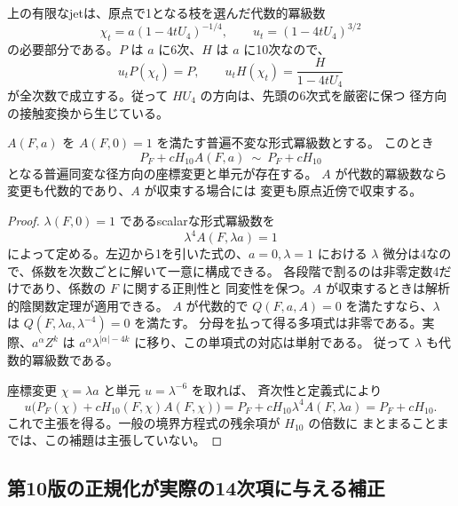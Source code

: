 \begin{remark}[径方向の変更を全次数で書く]
上の有限なjetは、原点で1となる枝を選んだ代数的冪級数
\[
 \chi_t=a(1-4tU_4)^{-1/4},\qquad
 u_t=(1-4tU_4)^{3/2}
\]
の必要部分である。$P$ は $a$ に6次、$H$ は $a$ に10次なので、
\[
 u_tP(\chi_t)=P,
 \qquad u_tH(\chi_t)=\frac{H}{1-4tU_4}
\]
が全次数で成立する。従って $HU_4$ の方向は、先頭の6次式を厳密に保つ
径方向の接触変換から生じている。
\end{remark}

\begin{lemma}[Hessian項の単元係数は径方向に正規化できる]
\label{lem:v11-radial-hessian-unit}
$A(F,a)$ を $A(F,0)=1$ を満たす普遍不変な形式冪級数とする。
このとき
\[
 P_F+cH_{10}A(F,a)\ \sim\ P_F+cH_{10}
\]
となる普遍同変な径方向の座標変更と単元が存在する。
$A$ が代数的冪級数なら変更も代数的であり、$A$ が収束する場合には
変更も原点近傍で収束する。
\end{lemma}
\begin{proof}
$\lambda(F,0)=1$ であるscalarな形式冪級数を
\[
 \lambda^4 A(F,\lambda a)=1
\]
によって定める。左辺から1を引いた式の、$a=0,\lambda=1$ における
$\lambda$ 微分は4なので、係数を次数ごとに解いて一意に構成できる。
各段階で割るのは非零定数4だけであり、係数の $F$ に関する正則性と
同変性を保つ。$A$ が収束するときは解析的陰関数定理が適用できる。
$A$ が代数的で $Q(F,a,A)=0$ を満たすなら、$\lambda$ は
$Q(F,\lambda a,\lambda^{-4})=0$ を満たす。
分母を払って得る多項式は非零である。実際、$a^\alpha Z^k$ は
$a^\alpha\lambda^{|\alpha|-4k}$ に移り、この単項式の対応は単射である。
従って $\lambda$ も代数的冪級数である。

座標変更 $\chi=\lambda a$ と単元 $u=\lambda^{-6}$ を取れば、
斉次性と定義式により
\[
 u\bigl(P_F(\chi)+cH_{10}(F,\chi)A(F,\chi)\bigr)
 =P_F+cH_{10}\lambda^4A(F,\lambda a)=P_F+cH_{10}.
\]
これで主張を得る。一般の境界方程式の残余項が $H_{10}$ の倍数に
まとまることまでは、この補題は主張していない。
\end{proof}

\subsection{第10版の正規化が実際の14次項に与える補正}
\label{subsec:v11-actual-fourteen-correction}

